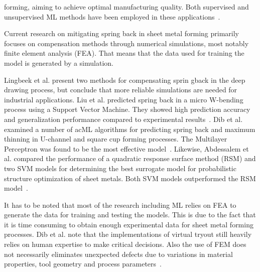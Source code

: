 forming, aiming to achieve optimal manufacturing quality. Both supervised and unsupervised \ac{ML} methods have been
employed in these applications~\cite[p. 2]{cruz_applicationmachinelearning_2021}.

Current research on mitigating spring back in sheet metal forming primarily focuses on compensation methods through
numerical simulations, most notably finite element analysis (FEA)\cite[p. 565]{liu2021deep}.
That means that the data used for training the model is generated by a simulation.

Lingbeek et al.\cite{lingbeek2005development} present two methods for compensating sprin gback in the deep
drawing process, but conclude that more reliable simulations are needed for industrial applications.
Liu et al. predicted spring back in a micro W-bending process using a Support Vector Machine. They showed high
prediction accuracy and generalization performance compared to experimental
results~\cite[p. 1]{liu_springbackpredictionforming_2019}.
Dib et al. examined a number of ac{ML} algorithms for predicting spring back and maximum thinning in U-channel and
square cup forming processes. The Multilayer Perceptron was found to be the most effective
model~\cite{dib_singleensembleclassifiers_2020}.
Likewise, Abdessalem et al. compared the performance of a quadratic response surface method (RSM) and two \ac{SVM}
models for determining the best surrogate model for probabilistic structure optimization of sheet metals.
Both \ac{SVM} models outperformed the RSM model~\cite[]{abdessalem2015probabilistic}.

It has to be noted that most of the research including \ac{ML} relies on FEA to generate the data for training and
testing the models.
This is due to the fact that it is time consuming to obtain enough experimental data for
sheet metal forming processes.
Dib et al. note that the implementations of virtual tryout still heavily relies on human expertise to make critical
decisions.
Also the use of FEM does not necessarily eliminates unexpected defects due to variations
in material properties, tool geometry and process parameters~\cite[p. 2]{dib_singleensembleclassifiers_2020}.

